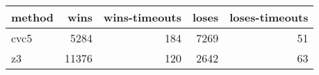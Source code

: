 \begin{tabular}{lrrrr}
\hline
 method   &   wins &   wins-timeouts &   loses &   loses-timeouts \\
\hline
 cvc5     &   5284 &             184 &    7269 &               51 \\
 z3       &  11376 &             120 &    2642 &               63 \\
\hline
\end{tabular}
